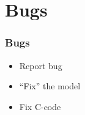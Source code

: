 \documentclass{beamer}
\begin{document}
\section{Bugs}
\begin{frame}
  \frametitle{Bugs}
  \begin{itemize}
    \item Report bug
    \item ``Fix'' the model
    \item Fix C-code
  \end{itemize}
\end{frame}

\end{document}
